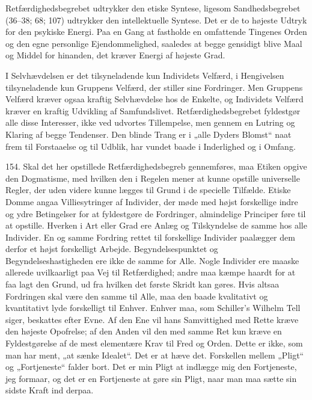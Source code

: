\documentclass[12pt,a4paper]{book}
\newcommand{\apage}[1]{\marginnote{\footnotesize\textit{[#1]}}}
\begin{document}
Retfærdighedsbegrebet udtrykker den etiske Syntese, ligesom Sandhedsbegrebet (36--38; 68;
107) udtrykker den intellektuelle Syntese. Det er de to højeste Udtryk for den psykiske
Energi. Paa en Gang at fastholde en omfattende Tingenes Orden og den egne personlige
Ejendommelighed, saaledes at begge gensidigt blive Maal og Middel for hinanden, det kræver
Energi af højeste Grad.

I Selvhævdelsen er det tilsyneladende kun Individets Velfærd, i Hengivelsen tilsyneladende
kun Gruppens Velfærd, der stiller sine Fordringer. Men Gruppens Velfærd kræver ogsaa
kraftig Selvhævdelse hos de Enkelte, og Individets \apage{368} Velfærd kræver en kraftig Udvikling af
Samfundslivet. Retfærdighedsbegrebet fyldestgør alle disse Interesser, ikke ved udvortes
Tillempelse, men gennem en Lutring og Klaring af begge Tendenser. Den blinde Trang er i
„alle Dyders Blomst“ naat frem til Forstaaelse og til Udblik, har vundet baade i
Inderlighed og i Omfang.

154. Skal det her opstillede Retfærdighedsbegreb gennemføres, maa Etiken opgive den
Dogmatisme, med hvilken den i Regelen mener at kunne opstille universelle Regler, der uden
videre kunne lægges til Grund i de specielle Tilfælde. Etiske Domme angaa Villiesytringer
af Individer, der møde med højst forskellige indre og ydre Betingelser for at fyldestgøre
de Fordringer, almindelige Principer føre til at opstille. Hverken i Art eller Grad ere
Anlæg og Tilskyndelse de samme hos alle Individer. En og samme Fordring rettet til
forskellige Individer paalægger dem derfor et højst forskelligt Arbejde. Begyndelsespunktet
og Begyndelseshastigheden ere ikke de samme for Alle. Nogle Individer ere maaske allerede
uvilkaarligt paa Vej til Retfærdighed; andre maa kæmpe haardt for at faa lagt den Grund, ud
fra hvilken det første Skridt kan gøres. Hvis altsaa Fordringen skal være den samme til
Alle, maa den baade kvalitativt og kvantitativt lyde forskelligt til Enhver. Enhver maa,
som Schiller's Wilhelm Tell siger, beskattes efter Evne. Af den Ene vil hans Samvittighed
med Rette kræve den højeste Opofrelse; af den Anden vil den med samme Ret kun kræve en
Fyldestgørelse af de mest elementære Krav til Fred og Orden. Dette er ikke, som man har
ment, „at sænke Idealet“. Det er at hæve det. Forskellen mellem „Pligt“ og „Fortjeneste“
falder bort. Det er min Pligt at indlægge mig den Fortjeneste, jeg formaar, og det er en
Fortjeneste at gøre sin Pligt, naar man maa sætte sin sidste Kraft ind derpaa.
\end{document}
